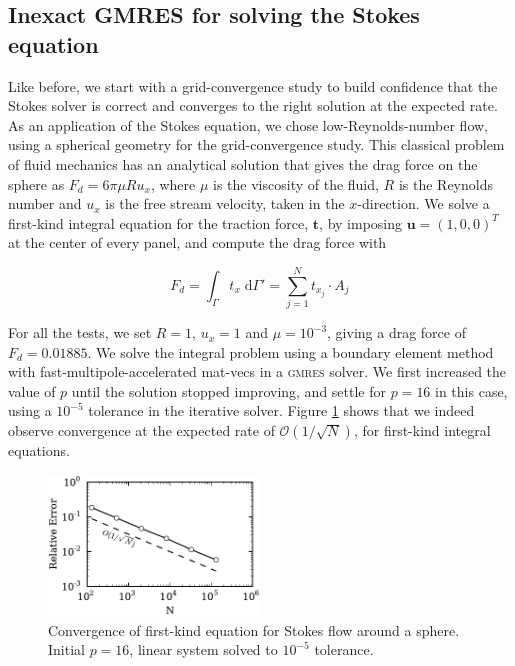 \documentclass[final,leqno,]{siamltex1213}
\renewcommand{\O}[1]{\mathcal{O}(#1)}
\newcommand{\gmres}{\textsc{gmres}\xspace}
\newcommand{\di}[1]{\text{d}#1}
\newcommand{\vect}[1]{\mathbf{#1}}
\begin{document}
\subsection{Inexact {\small GMRES} for solving the Stokes equation}
Like before, we start with a grid-convergence study to build confidence that the Stokes solver is correct and converges to the right solution at the expected rate. As an application of the Stokes equation, we chose low-Reynolds-number flow, using a spherical geometry for the grid-convergence study. This classical problem of fluid mechanics has an analytical solution that gives the drag force on the sphere as $F_d = 6\pi\mu Ru_x$, where $\mu$ is the viscosity of the fluid, $R$ is the Reynolds number and $u_x$ is the free stream velocity, taken in the $x$-direction. We solve a first-kind integral equation for the traction force, $\vect{t}$, by imposing $\vect{u} = (1,0,0)^{T}$ at the center of every panel, and compute the drag force with

\begin{equation}
	\label{eqn:stokes_traction_drag}
	F_d = \int_\Gamma t_x\;\di{\Gamma'} = \sum_{j=1}^{N} t_{x_j}\cdot A_j
\end{equation}

For all the tests, we set $R=1$, $u_x = 1$ and $\mu = 10^{-3}$, giving a drag force of $F_d = 0.01885$. We solve the integral problem using a boundary element method with fast-multipole-accelerated mat-vecs in a \gmres solver. We first increased the value of $p$ until the solution stopped improving, and settle for $p=16$ in this case, using a $10^{-5}$ tolerance in the iterative solver.
Figure \ref{fig:stokes_convergence} shows that we indeed observe convergence at the expected rate of $\O{1 / \sqrt{N}}$, for first-kind integral equations.

\begin{figure}[h]
\begin{center}
	\includegraphics[natwidth=3in,natheight=2in,width=0.5\textwidth]{StokesConvergence.pdf}
	\caption{Convergence of first-kind equation for Stokes flow around a sphere. Initial $p=16$, linear system solved to $10^{-5}$ tolerance.}
	\label{fig:stokes_convergence}
\end{center}
\end{figure}
\end{document}
